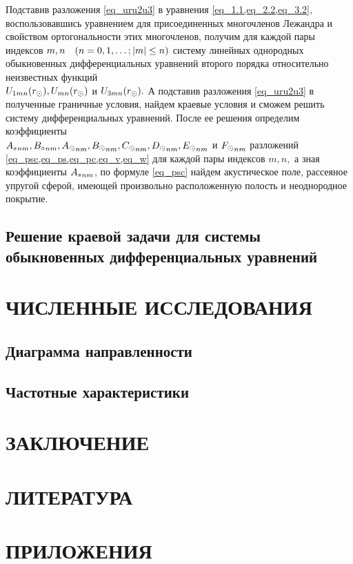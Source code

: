 Подставив разложения \cref{eq_uru2u3} в уравнения \cref{eq_1.1,eq_2.2,eq_3.2}, воспользовавшись уравнением для присоединенных многочленов Лежандра и свойством ортогональности этих многочленов, получим для каждой пары индексов $m,n \q(n = 0,1,\ldots; \lvert m\rvert\leq n)$ систему линейных однородных обыкновенных дифференциальных уравнений второго порядка относительно неизвестных функций \\ $U_{1mn}(r\s), U_{mn}(r\s)$ и $U_{3mn}(r\s).$ А подставив разложения \cref{eq_uru2u3} в полученные граничные условия, найдем краевые условия и сможем решить  систему дифференциальных уравнений. После ее решения определим коэффициенты \\
${A\sc}_{nm}, {B\c}_{nm}, {A\s}_{nm}, {B\s}_{nm}, {C\s}_{nm}, {D\s}_{nm}, {E\s}_{nm}$ и $ {F\s}_{nm}$ разложений  \cref{eq_psc,eq_ps,eq_pc,eq_v,eq_w} для каждой пары индексов $m,n,$ а зная коэффициенты ${A\sc}_{nm}$, по формуле \cref{eq_psc} найдем акустическое поле, рассеяное упругой сферой, имеющей произвольно расположенную полость и неоднородное покрытие.

\newpage
\subsection{Решение краевой задачи для системы обыкновенных дифференциальных уравнений}

\newpage
\section{ЧИСЛЕННЫЕ ИССЛЕДОВАНИЯ}

\newpage
\subsection{Диаграмма направленности}

\newpage
\subsection{Частотные характеристики}

\newpage
\section*{ЗАКЛЮЧЕНИЕ}


\newpage
\section*{ЛИТЕРАТУРА}


\newpage
\section*{ПРИЛОЖЕНИЯ}



